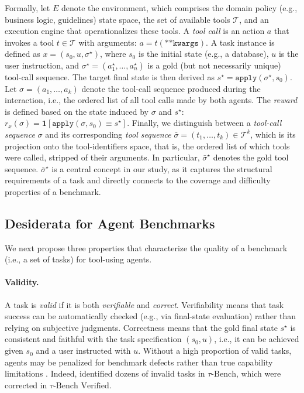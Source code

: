 Formally, let $E$ denote the environment, which comprises the domain policy (e.g., business logic, guidelines) state space, the set of available tools $\mathcal{T}$, and an execution engine that operationalizes these tools. 
A \emph{tool call} is an action $a$ that invokes a tool $t\in\mathcal{T}$ with arguments: $a=t(\texttt{**kwargs})$. A task instance is defined as $x = (s_0, u, \sigma^\star)$, where $s_0$ is the initial state (e.g., a database), $u$ is the user instruction, and $\sigma^\star=(a_1^\star,\ldots,a_{n}^\star)$ is a gold (but not necessarily unique) tool-call sequence. The target final state is then derived as $s^\star = \texttt{apply}(\sigma^\star, s_0)$.
Let $\sigma = (a_1, \dots, a_k)$ denote the tool-call sequence produced during the interaction, i.e., the ordered list of all tool calls made by both agents.
The \emph{reward} is defined based on the state induced by $\sigma$ and $s^\star$: $r_x(\sigma) = \mathbf{1}[\texttt{apply}(\sigma, s_0) \equiv s^\star]$. Finally, we distinguish between a \emph{tool-call sequence} $\sigma$ and its corresponding \emph{tool sequence} $\bar\sigma=(t_1, \ldots, t_k)\in\mathcal{T}^k$, which is its projection onto the tool-identifiers space, that is, the ordered list of which tools were called, stripped of their arguments. In particular, $\bar\sigma^\star$ denotes the gold tool sequence. $\bar\sigma^\star$ is a central concept in our study, as it captures the structural requirements of a task and directly connects to the coverage and difficulty properties of a benchmark.

\subsection{Desiderata for Agent Benchmarks}
\label{sec:benchmark_quality}

We next propose three properties that characterize the quality of a benchmark (i.e., a set of tasks) for tool-using agents.

\paragraph{Validity.} A task is \emph{valid} if it is both \emph{verifiable} and \emph{correct}. Verifiability means that task success can be automatically checked (e.g., via final-state evaluation) rather than relying on subjective judgments. Correctness means that the gold final state $s^\star$ is consistent and faithful with the task specification $(s_0, u)$, i.e., it can be achieved given $s_0$ and a user instructed with $u$. Without a high proportion of valid tasks, agents may be penalized for benchmark defects rather than true capability limitations \citep{bestpractices2025Zhu}. Indeed, \citep{saber2025cuadron} identified dozens of invalid tasks in $\tau\text{-Bench}$, which were corrected in $\tau\text{-Bench Verified}$.

